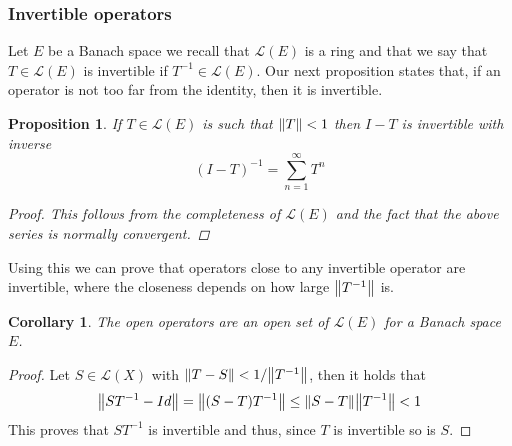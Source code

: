 \documentclass[12pt]{article}
\newtheorem{proposition}{Proposition}
\newtheorem{corollary}{Corollary}
\begin{document}
\subsubsection{Invertible operators}
Let $E$ be a Banach space we recall that $\mathcal{L}(E)$ is a ring and that we say that $T\in\mathcal{L}(E)$ is invertible if $T^{-1}\in\mathcal{L}(E)$. Our next proposition states that, if an operator is not too far from the identity, then it is invertible.
\begin{proposition}
    If $T\in\mathcal{L}(E)$ is such that $\norm{T}<1$ then $I-T$ is invertible with inverse
    \begin{equation*}
        (I-T)^{-1}=\sum_{n=1}^\infty T^n
    \end{equation*}
    \begin{proof}
        This follows from the completeness of $\mathcal{L}(E)$ and the fact that the above series is normally convergent.
    \end{proof}
\end{proposition}
Using this we can prove that operators close to any invertible operator are invertible, where the closeness depends on how large $\norm{T^{-1}}$ is.
\begin{corollary}
    The open operators are an open set of $\mathcal{L}(E)$ for a Banach space $E$.
\end{corollary}
\begin{proof}
    Let $S\in\mathcal{L}(X)$  with $\norm{T-S}<1/\norm{T^{-1}}$, then it holds that
    \begin{equation*}
        \norm{ST^{-1}-Id}=\norm{(S-T)T^{-1}}\leq\norm{S-T}\norm{T^{-1}}<1
    \end{equation*}
    This proves that $ST^{-1}$ is invertible and thus, since $T$ is invertible so is $S$.
\end{proof}
\end{document}
